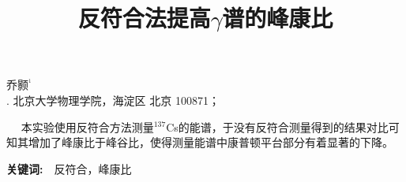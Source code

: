 \documentclass[a4paper,10.0pt,twoside]{npr}
\begin{document}
\setcounter{page}{001}%
\begin{center}
\title{%
\xiaoerhao \bf  %
反符合法提高$\gamma$谱的峰康比\\[-5mm]}
\maketitle
\large \fs
乔颢$^{^1}$\\[2mm]

\xiaowu {}. 北京大学物理学院，海淀区 北京 100871；\\[4mm]

 

\parbox{158mm} {
~~\fs
本实验使用反符合方法测量$^{137}$Cs的能谱，于没有反符合测量得到的结果对比可知其增加了峰康比于峰谷比，使得测量能谱中康普顿平台部分有着显著的下降。

{\bf 关键词:}~~\fs 反符合，峰康比}\\
\end{center}
\vspace{5mm}
\setcounter{section}{0}
\end{document}
